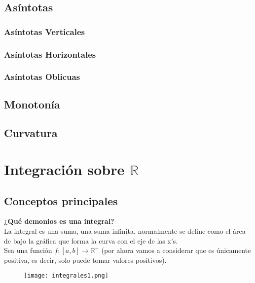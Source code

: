 \section{Asíntotas}
\subsection*{Asíntotas Verticales}
\subsection*{Asíntotas Horizontales}
\subsection*{Asíntotas Oblicuas}
\section{Monotonía}
\section{Curvatura}







\chapter{Integración sobre $\mathbb{R}$}
\minitoc

\newpage

\section{Conceptos principales}
\noindent
\textbf{¿Qué demonios es una integral?}\\[1ex]
La integral es una suma, una suma infinita, normalmente se define como el área de bajo la gráfica que forma la curva con el eje de las x's.\\[2ex]
\noindent
Sea una función $f\colon [a,b] \longrightarrow \mathbb{R}^+$ (por ahora vamos a considerar que es únicamente positiva, es decir, solo puede tomar valores positivos). 
\begin{figure}[H]
\begin{center}
\graphicspath{{imagenes_analisis/}}
\texttt{[image: integrales1.png]}
\label{Función $f(x)$}
\end{center}
\end{figure}

